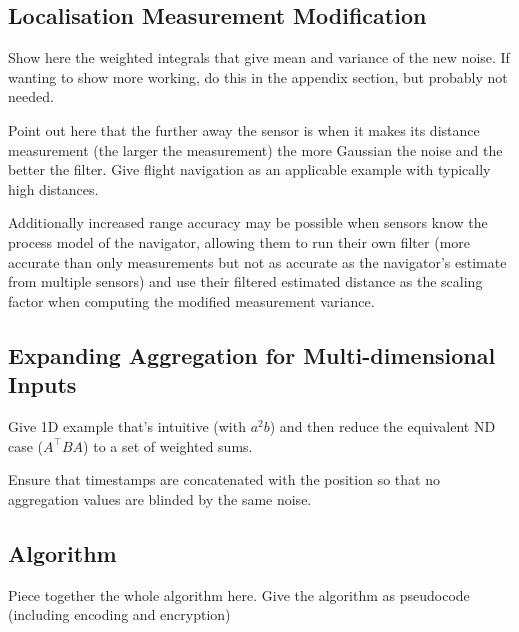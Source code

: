 \documentclass[twocolumn]{autart}
\theoremstyle{definition}
\theoremstyle{remark}
\begin{document}
\subsection{Localisation Measurement Modification}
Show here the weighted integrals that give mean and variance of the new noise. If wanting to show more working, do this in the appendix section, but probably not needed.

Point out here that the further away the sensor is when it makes its distance measurement (the larger the measurement) the more Gaussian the noise and the better the filter. Give flight navigation as an applicable example with typically high distances.

Additionally increased range accuracy may be possible when sensors know the process model of the navigator, allowing them to run their own filter (more accurate than only measurements but not as accurate as the navigator's estimate from multiple sensors) and use their filtered estimated distance as the scaling factor when computing the modified measurement variance.

\subsection{Expanding Aggregation for Multi-dimensional Inputs}
Give 1D example that's intuitive (with $a^2b$) and then reduce the equivalent ND case ($A^\top BA$) to a set of weighted sums.

Ensure that timestamps are concatenated with the position so that no aggregation values are blinded by the same noise.

\subsection{Algorithm}
Piece together the whole algorithm here.
Give the algorithm as pseudocode (including encoding and encryption)



\end{document}
